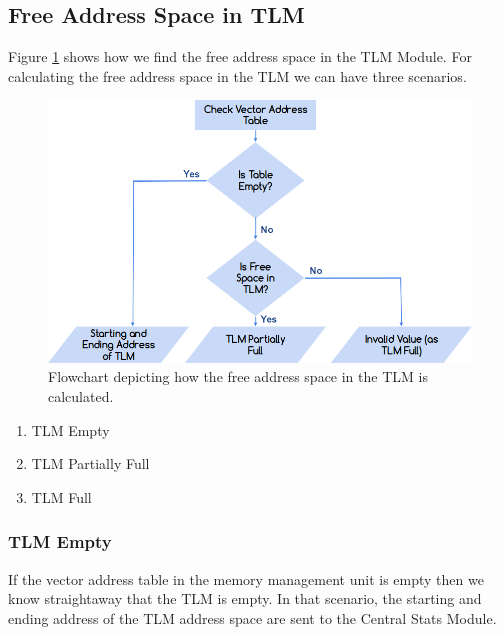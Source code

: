 \documentclass{listhesis}
\begin{document}
\subsection{Free Address Space in TLM}
Figure \ref{fig:freeSpaceTLM} shows how we find the free address space in the TLM Module. For calculating the free address space in the TLM we can have three scenarios. 
\begin{figure}
  \includegraphics[width=\linewidth]{freespace.png}
  \centering
  \caption{Flowchart depicting how the free address space in the TLM is calculated.}
  \label{fig:freeSpaceTLM}
\end{figure}
\begin{enumerate}
  \item TLM Empty 
  \item TLM Partially Full
  \item TLM Full
\end{enumerate}
\subsubsection{TLM Empty}
If the vector address table in the memory management unit is empty then we know straightaway that the TLM is empty. In that scenario, the starting and ending address of the TLM address space are sent to the Central Stats Module.\\ 
\end{document}
